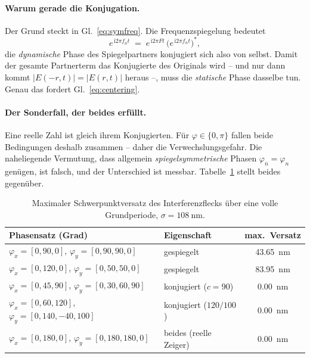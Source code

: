\documentclass[11pt,a4paper]{article}
\begin{document}
\paragraph{Warum gerade die Konjugation.}
Der Grund steckt in Gl.~\eqref{eq:symfreq}. Die Frequenzspiegelung bedeutet
\begin{equation}
  e^{\,\mathrm{i}2\pi f_{\bar n}t}
  \;=\; e^{\,\mathrm{i}2\pi F t}\,\bigl(e^{\,\mathrm{i}2\pi f_{n}t}\bigr)^{*} ,
\end{equation}
die \emph{dynamische} Phase des Spiegelpartners konjugiert sich also von
selbst. Damit der gesamte Partnerterm das Konjugierte des Originals wird --
und nur dann kommt $|E(-r,t)|=|E(r,t)|$ heraus --, muss die \emph{statische}
Phase dasselbe tun. Genau das fordert Gl.~\eqref{eq:centering}.

\paragraph{Der Sonderfall, der beides erfüllt.}
Eine reelle Zahl ist gleich ihrem Konjugierten. Für
$\varphi\in\{0,\pi\}$ fallen beide Bedingungen deshalb zusammen -- daher die
Verwechslungsgefahr. Die naheliegende Vermutung, dass allgemein
\emph{spiegelsymmetrische} Phasen $\varphi_{\bar n} = \varphi_n$ genügen, ist
falsch, und der Unterschied ist messbar. Tabelle~\ref{tab:mirror} stellt beides gegenüber.

\begin{table}[htb]
  \centering
  \caption{Maximaler Schwerpunktversatz des Interferenzflecks über eine volle
  Grundperiode, $\sigma = \SI{108}{\nano\meter}$.}
  \label{tab:mirror}
  \begin{tabular}{llc}
    \toprule
    Phasensatz (Grad) & Eigenschaft & max.\ Versatz\\
    \midrule
    $\varphi_x=[0,90,0]$, $\varphi_y=[0,90,90,0]$      & gespiegelt             & \SI{43.65}{\nano\meter}\\
    $\varphi_x=[0,120,0]$, $\varphi_y=[0,50,50,0]$     & gespiegelt             & \SI{83.95}{\nano\meter}\\
    $\varphi_x=[0,45,90]$, $\varphi_y=[0,30,60,90]$    & konjugiert ($c=90$)    & \SI{0.00}{\nano\meter}\\
    $\varphi_x=[0,60,120]$, $\varphi_y=[0,140,-40,100]$& konjugiert ($120/100$) & \SI{0.00}{\nano\meter}\\
    $\varphi_x=[0,180,0]$, $\varphi_y=[0,180,180,0]$   & beides (reelle Zeiger) & \SI{0.00}{\nano\meter}\\
    \bottomrule
  \end{tabular}
\end{table}
\end{document}
